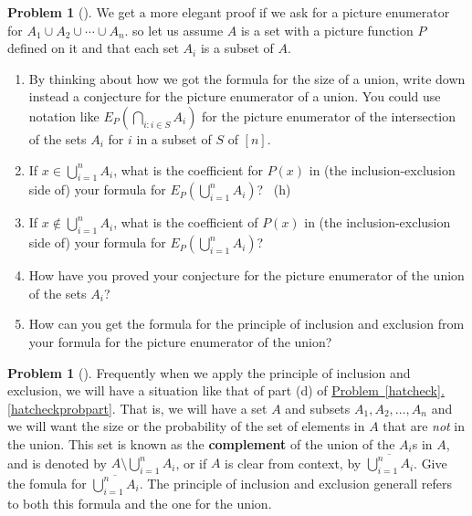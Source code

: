 \documentclass[10pt,]{book}
\newcommand{\terminology}[1]{\textbf{#1}}
\theoremstyle{plain}
\theoremstyle{definition}
\newtheorem{activity}[project]{Problem}
\theoremstyle{definition}
\numberwithin{equation}{chapter}
\begin{document}
\begin{activity}[]\marginsymbol[-1em]{} \label{activity-233}
\hypertarget{p-1354}{}%
We get a more elegant proof if we ask for a picture enumerator for \(A_1 \cup A_2 \cup \cdots \cup A_n\).  so let us assume \(A\) is a set with a picture function \(P\) defined on it and that each set \(A_i\) is a subset of \(A\).%
\begin{enumerate}[font=\bfseries,label=(\alph*),ref=\alph*]
\item\label{task-173} \marginsymbol[-2.5em]{} \hypertarget{p-1355}{}%
By thinking about how we got the formula for the size of a union, write down instead a conjecture for the picture enumerator of a union.  You could use notation like \(E_P(\bigcap_{i:i\in S} A_i)\) for the picture enumerator of the intersection of the sets \(A_i\) for \(i\) in a subset of \(S\) of \([n]\).%
\item\label{task-174} \marginsymbol[-2.5em]{} \hypertarget{p-1357}{}%
If \(x \in \bigcup_{i=1}^n A_i\), what is the coefficient for \(P(x)\) in (the inclusion-exclusion side of) your formula for \(E_P(\bigcup_{i=1}^n A_i)\)?%
~{\tiny (h)}\item\label{task-175} \marginsymbol[-2.5em]{} \hypertarget{p-1361}{}%
If \(x \notin \bigcup_{i=1}^n A_i\), what is the coefficient of \(P(x)\) in (the inclusion-exclusion side of) your formula for \(E_P(\bigcup_{i=1}^n A_i)\)?%
\item\label{task-176} \marginsymbol[-2.5em]{} \hypertarget{p-1363}{}%
How have you proved your conjecture for the picture enumerator of the union of the sets \(A_i\)?%
\item\label{task-177} \marginsymbol[-2.5em]{} \hypertarget{p-1365}{}%
How can you get the formula for the principle of inclusion and exclusion from your formula for the picture enumerator of the union?%
\end{enumerate}
\end{activity}
\begin{activity}[]\marginsymbol[-1em]{} \label{compunion}
\hypertarget{p-1367}{}%
Frequently when we apply the principle of inclusion and exclusion, we will have a situation like that of part (d) of \hyperref[hatcheckprobpart]{Problem~\ref{hatcheck}.\ref{hatcheckprobpart}}.  That is, we will have a set \(A\) and subsets \(A_1, A_2, \ldots, A_n\) and we will want the size or the probability of the set of elements in \(A\) that are \emph{not} in the union.  This set is known as the \terminology{complement}  of the union of the \(A_i\)s in \(A\), and is denoted by \(A \setminus \bigcup_{i=1}^n A_i\), or if \(A\) is clear from context, by \(\overline{\bigcup_{i=1}^n A_i}\). Give the fomula for \(\overline{\bigcup_{i=1}^n A_i}\).  The principle of inclusion and exclusion generall refers to both this formula and the one for the union.%
\end{activity}
\end{document}
